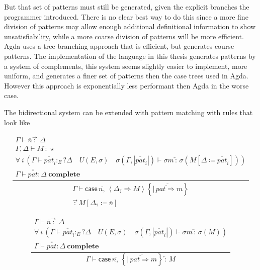 But that set of patterns must still be generated, given the explicit branches the programmer introduced.
There is no clear best way to do this since a more fine division of patterns may allow enough additional definitional information to show unsatisfiability, while a more coarse division of patterns will be more efficient.
Agda uses a tree branching approach that is efficient, but generates course patterns.
The implementation of the language in this thesis generates patterns by a system of complements, this system seems slightly easier to implement, more uniform, and generates a finer set of patterns then the case trees used in Agda.
However this approach is exponentially less performant then Agda in the worse case. 

The bidirectional system can be extended with pattern matching with rules that look like 

\[
\frac{\begin{array}{c}
\Gamma\vdash\overline{n}\overrightarrow{\,:\,}\ \Delta\\
\Gamma,\Delta\vdash M\overleftarrow{\,:\,}\star\\
\forall\:i\,\left(\Gamma\vdash\overline{pat}_{i}:_{E}?\Delta\quad U\left(E,\sigma\right)\quad\sigma\left(\Gamma,|\overline{pat}_{i}|\right)\vdash\sigma m\overleftarrow{\,:\,}\sigma\left(M\left[\Delta\coloneqq\overline{pat}_{i}\right]\right)\right)\\
\Gamma\vdash\overline{\overline{pat}}:\Delta\ \mathbf{complete}
\end{array}}{\begin{array}{c}
\Gamma\vdash\mathsf{case}\,\overline{n,}\,\left\langle \Delta_{?}\Rightarrow M\right\rangle \left\{ \overline{|\,\overline{pat\Rightarrow}m}\right\} \\
\overrightarrow{\,:\,}M\left[\Delta_{?}\coloneqq\overline{n}\right]
\end{array}}
\]


\[
\frac{\begin{array}{c}
\Gamma\vdash\overline{n}\overrightarrow{\,:\,}\ \Delta\\
\forall\:i\,\left(\Gamma\vdash\overline{pat}_{i}:_{E}?\Delta\quad U\left(E,\sigma\right)\quad\sigma\left(\Gamma,|\overline{pat}_{i}|\right)\vdash\sigma m\overleftarrow{\,:\,}\sigma\left(M\right)\right)\\
\Gamma\vdash\overline{\overline{pat}}:\Delta\ \mathbf{complete}
\end{array}}{\Gamma\vdash\mathsf{case}\,\overline{n,}\,\left\{ \overline{|\,\overline{pat\Rightarrow}m}\right\} \overleftarrow{\,:\,}M}
\]

